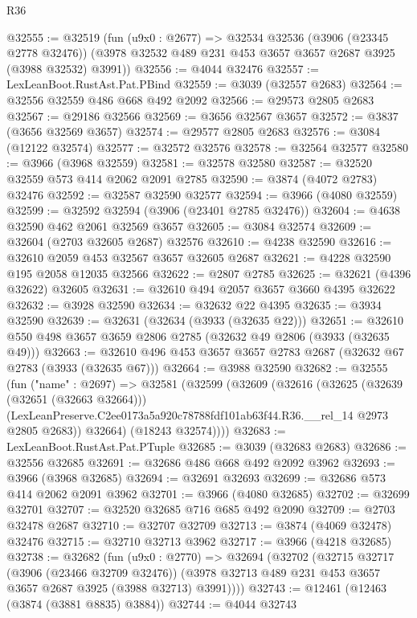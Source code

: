 \begin{lexlean}{R36}
\begin{coremodule}
@32555 := @32519
    (fun (u9x0 : @2677) =>
    @32534
      @32536
      (@3906 (@23345 @2778 @32476))
      (@3978 @32532 @489 @231 @453 @3657 @3657 @2687 @3925 (@3988 @32532) @3991))
@32556 := @4044 @32476
@32557 := LexLeanBoot.RustAst.Pat.PBind
@32559 := @3039 (@32557 @2683)
@32564 := @32556 @32559 @486 @668 @492 @2092
@32566 := @29573 @2805 @2683
@32567 := @29186 @32566
@32569 := @3656 @32567 @3657
@32572 := @3837 (@3656 @32569 @3657)
@32574 := @29577 @2805 @2683
@32576 := @3084 (@12122 @32574)
@32577 := @32572 @32576
@32578 := @32564 @32577
@32580 := @3966 (@3968 @32559)
@32581 := @32578 @32580
@32587 := @32520 @32559 @573 @414 @2062 @2091 @2785
@32590 := @3874 (@4072 @2783) @32476
@32592 := @32587 @32590 @32577
@32594 := @3966 (@4080 @32559)
@32599 := @32592 @32594 (@3906 (@23401 @2785 @32476))
@32604 := @4638 @32590 @462 @2061 @32569 @3657
@32605 := @3084 @32574
@32609 := @32604 (@2703 @32605 @2687) @32576
@32610 := @4238 @32590
@32616 := @32610 @2059 @453 @32567 @3657 @32605 @2687
@32621 := @4228 @32590 @195 @2058 @12035 @32566
@32622 := @2807 @2785
@32625 := @32621 (@4396 @32622) @32605
@32631 := @32610 @494 @2057 @3657 @3660 @4395 @32622
@32632 := @3928 @32590
@32634 := @32632 @22 @4395
@32635 := @3934 @32590
@32639 := @32631 (@32634 (@3933 (@32635 @22)))
@32651 := @32610 @550 @498 @3657 @3659 @2806 @2785 (@32632 @49 @2806 (@3933 (@32635 @49)))
@32663 := @32610 @496 @453 @3657 @3657 @2783 @2687 (@32632 @67 @2783 (@3933 (@32635 @67)))
@32664 := @3988 @32590
@32682 := @32555
    (fun ("name" : @2697) =>
    @32581
      (@32599
        (@32609
          (@32616
            (@32625
              (@32639 (@32651 (@32663 @32664)))
              (LexLeanPreserve.C2ee0173a5a920c78788fdf101ab63f44.R36.__rel_14 @2973 @2805 @2683))
            @32664)
          (@18243 @32574))))
@32683 := LexLeanBoot.RustAst.Pat.PTuple
@32685 := @3039 (@32683 @2683)
@32686 := @32556 @32685
@32691 := @32686 @486 @668 @492 @2092 @3962
@32693 := @3966 (@3968 @32685)
@32694 := @32691 @32693
@32699 := @32686 @573 @414 @2062 @2091 @3962
@32701 := @3966 (@4080 @32685)
@32702 := @32699 @32701
@32707 := @32520 @32685 @716 @685 @492 @2090
@32709 := @2703 @32478 @2687
@32710 := @32707 @32709
@32713 := @3874 (@4069 @32478) @32476
@32715 := @32710 @32713 @3962
@32717 := @3966 (@4218 @32685)
@32738 := @32682
    (fun (u9x0 : @2770) =>
    @32694
      (@32702
        (@32715
          @32717
          (@3906 (@23466 @32709 @32476))
          (@3978 @32713 @489 @231 @453 @3657 @3657 @2687 @3925 (@3988 @32713) @3991))))
@32743 := @12461 (@12463 (@3874 (@3881 @8835) @3884))
@32744 := @4044 @32743

\end{coremodule}
\end{lexlean}
